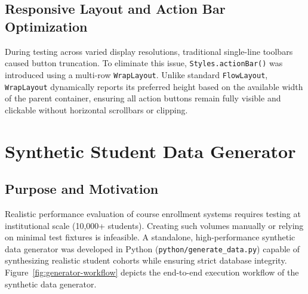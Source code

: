 \subsection{Responsive Layout and Action Bar Optimization}
During testing across varied display resolutions, traditional single-line toolbars caused button truncation. To eliminate this issue, \texttt{Styles.actionBar()} was introduced using a multi-row \texttt{WrapLayout}. Unlike standard \texttt{FlowLayout}, \texttt{WrapLayout} dynamically reports its preferred height based on the available width of the parent container, ensuring all action buttons remain fully visible and clickable without horizontal scrollbars or clipping.

\section{Synthetic Student Data Generator}
\label{sec:synthetic-data}

\subsection{Purpose and Motivation}
Realistic performance evaluation of course enrollment systems requires testing at institutional scale (10{,}000+ students). Creating such volumes manually or relying on minimal test fixtures is infeasible. A standalone, high-performance synthetic data generator was developed in Python (\texttt{python/generate\_data.py}) capable of synthesizing realistic student cohorts while ensuring strict database integrity. Figure~\ref{fig:generator-workflow} depicts the end-to-end execution workflow of the synthetic data generator.

